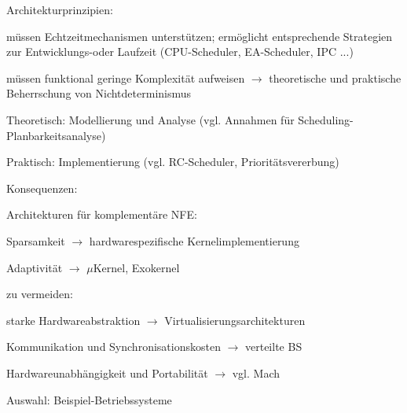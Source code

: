 \documentclass[a4paper]{article}
\begin{document}
\begin{multicols}{3}
    \begin{itemize*}
        \item Architekturprinzipien:
        \begin{itemize*}
            \item müssen Echtzeitmechanismen unterstützen; ermöglicht entsprechende Strategien zur Entwicklungs-oder Laufzeit (CPU-Scheduler, EA-Scheduler, IPC ...)
            \item müssen funktional geringe Komplexität aufweisen $\rightarrow$ theoretische und praktische Beherrschung von Nichtdeterminismus \begin{itemize*} \item Theoretisch: Modellierung und Analyse (vgl. Annahmen für Scheduling-Planbarkeitsanalyse) \item Praktisch: Implementierung (vgl. RC-Scheduler, Prioritätsvererbung) \end{itemize*}
        \end{itemize*}
        \item Konsequenzen:
        \begin{itemize*}
            \item Architekturen für komplementäre NFE: \begin{itemize*} \item Sparsamkeit $\rightarrow$ hardwarespezifische Kernelimplementierung \item Adaptivität $\rightarrow$ $\mu$Kernel, Exokernel \end{itemize*}
            \item zu vermeiden: \begin{itemize*} \item starke Hardwareabstraktion $\rightarrow$ Virtualisierungsarchitekturen \item Kommunikation und Synchronisationskosten $\rightarrow$ verteilte BS \item Hardwareunabhängigkeit und Portabilität $\rightarrow$ vgl. Mach \end{itemize*}
        \end{itemize*}
    \end{itemize*}

    Auswahl: Beispiel-Betriebssysteme


\end{multicols}
\end{document}
